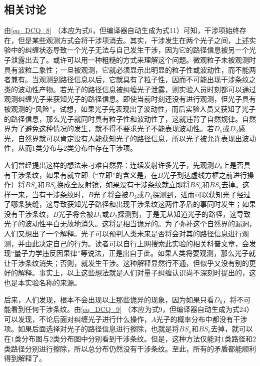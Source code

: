 \subsection{相关讨论}
由\autoref{eq_DCQ_8} （本应为式6，但编译器自动生成为式11）可知，干涉项始终存在，但是某些观测方式会将干涉项消去。其实，干涉发生在两个光子之间，上述实验中的纠缠状态导致一个光子无法与自己发生干涉，因为它的路径信息被另一个光子泄露出去了。或许可以用一种粗糙的方式来理解这个问题。微观粒子未被观测时具有波粒二象性；一旦被观测，它就必须显示出明显的粒子性或波动性，而不能两者兼有。当观测到路径信息以后，它就具有了粒子性，因而不可能出现干涉条纹之类的波动性产物。若光子的路径信息被纠缠光子泄露，则实验人员时刻都可以通过观测纠缠光子来获知光子的路径信息。即使当前时刻还没有进行观测，但光子具有被观测的“风险”。试想，如果光子先表现出了波动性，而后实验人员又获知了光子的路径信息，那么光子就同时具有粒子性和波动性了，这就违背了自然规律。自然界为了避免这种情况的发生，就不得不要求光子不能表现波动性。若$D_1$或$D_2$感光，自然界就可以肯定没有人能获知光子的路径信息，所以光子被允许表现出波动性，从而$1$类分布与$2$类分布中存在干涉项。

人们曾经提出这样的想法来刁难自然界：连续发射许多光子，先观测$D_0$上是否具有干涉条纹，如果有就立即（“立即”的含义是，在$B$光子到达虚线方框之前进行操作）将$BS_a$和$BS_b$换成全反射镜，如果没有干涉条纹就立即将$BS_a$和$BS_b$去掉。这样一来，当有干涉条纹时，$B$光子将会被$D_3$或$D_4$探测到，进而可以获知光子经过了哪条狭缝，这导致获知光子路径和出现干涉条纹这两件矛盾的事同时发生；如果没有干涉条纹，$B$光子将会被$D_1$或$D_2$探测到，于是无从知道光子的路径，这导致光子的波动性平白无故地消失。这将是相当诡异的。为了弥补这个自然界的漏洞，人们又想出了一个解释。光子可以预判人类未来是否将会对其的路径信息进行观测，并由此决定自己的行为。读者可以自行上网搜索此实验的相关科普文章，会发现“量子力学违反因果律”等说法，正是出自于此。如果人类将要观测，那么光子就让干涉条纹消失；否则，就发生干涉。这种解释显然行不通，但似乎又没有别的更好的解释。事实上，以上这些想法就是人们对量子纠缠认识尚不深刻时提出的，这也是本实验名称的来源。

后来，人们发现，根本不会出现以上那些诡异的现象，因为如果只看$D_0$，将不可能看到任何干涉条纹。由\autoref{eq_DCQ_9} （本应为式9，但编译器自动生成为式24）可以发现，不论后面对纠缠光子进行什么操作，$A$光子的概率分布中都没有干涉项。如果后面选择对光子的路径信息进行擦除，也就是将$BS_a$和$BS_b$去掉，就可以在$1$类分布图与$2$类分布图中分别看到干涉条纹。但是，这种方法仅能对$1$类路径和$2$类路径分别进行擦除，所以总分布仍然没有干涉条纹。至此，所有的矛盾都能顺利得到解释了。
